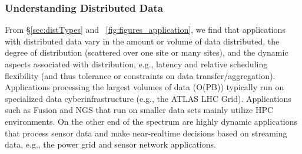 






\subsubsection{Understanding Distributed Data}

From \S\ref{sec:distTypes} and \figurename~\ref{fig:figures_application}, we
find that applications with distributed data vary in the amount or volume of
data distributed, the degree of distribution (scattered over one site or many
sites), and the dynamic aspects associated with distribution, e.g., latency and
relative scheduling flexibility (and thus tolerance or constraints on data
transfer/aggregation).  Applications processing the largest volumes of data
(O(PB)) typically run on specialized data cyberinfrastructure (e.g., the ATLAS
LHC Grid). Applications such as Fusion and NGS that run on smaller data sets
mainly utilize HPC environments. On the other end of the spectrum are highly
dynamic applications that process sensor data and make near-realtime decisions
based on streaming data, e.g., the power grid and sensor network applications.


